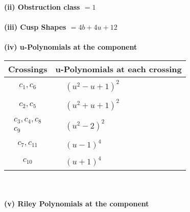 \documentclass[1p]{elsarticle_modified}
\theoremstyle{definition}
\begin{document}
\flushleft \textbf{(ii) Obstruction class $= 1$}\\~\\
\flushleft \textbf{(iii) Cusp Shapes $= 4 b+4 u+12$}\\~\\
\newpage\renewcommand{\arraystretch}{1}
\flushleft \textbf{(iv) u-Polynomials at the component}\newline \\
\begin{tabular}{m{50pt}|m{274pt}}
Crossings & \hspace{64pt}u-Polynomials at each crossing \\
\hline $$\begin{aligned}c_{1},c_{6}\end{aligned}$$&$\begin{aligned}
&(u^2- u+1)^2
\end{aligned}$\\
\hline $$\begin{aligned}c_{2},c_{5}\end{aligned}$$&$\begin{aligned}
&(u^2+u+1)^2
\end{aligned}$\\
\hline $$\begin{aligned}c_{3},c_{4},c_{8}\\c_{9}\end{aligned}$$&$\begin{aligned}
&(u^2-2)^2
\end{aligned}$\\
\hline $$\begin{aligned}c_{7},c_{11}\end{aligned}$$&$\begin{aligned}
&(u-1)^4
\end{aligned}$\\
\hline $$\begin{aligned}c_{10}\end{aligned}$$&$\begin{aligned}
&(u+1)^4
\end{aligned}$\\
\hline
\end{tabular}\\~\\
\newpage\renewcommand{\arraystretch}{1}
\flushleft \textbf{(v) Riley Polynomials at the component}\newline \\
\end{document}
